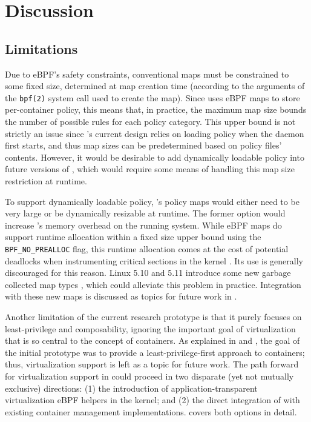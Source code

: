 \section{Discussion}
\label{sec:discussion}

\subsection{Limitations}

Due to eBPF's safety constraints, conventional maps must be constrained to some fixed size, determined at map creation time (according to the arguments of the \texttt{bpf(2)} system call used to create the map). Since \bpfcontain{} uses eBPF maps to store per-container policy, this means that, in practice, the maximum map size bounds the number of possible rules for each policy category. This upper bound is not strictly an issue since \bpfcontain{}'s current design relies on loading policy when the daemon first starts, and thus map sizes can be predetermined based on policy files' contents. However, it would be desirable to add dynamically loadable policy into future versions of \bpfcontain{}, which would require some means of handling this map size restriction at runtime.

To support dynamically loadable policy, \bpfcontain{}'s policy maps would either need to be very large or be dynamically resizable at runtime. The former option would increase \bpfcontain{}'s memory overhead on the running system. While eBPF maps do support runtime allocation within a fixed size upper bound using the \texttt{BPF\_NO\_PREALLOC} flag, this runtime allocation comes at the cost of potential deadlocks when instrumenting critical sections in the kernel \cite{starovoitov2016_prealloc}. Its use is generally discouraged for this reason. Linux 5.10 and 5.11 introduce some new garbage collected map types \cite{singh2020_task_local_storage, singh2020_inode_local_storage}, which could alleviate this problem in practice. Integration with these new maps is discussed as topics for future work in .

Another limitation of the current research prototype is that it purely focuses on least-privilege and composability, ignoring the important goal of virtualization that is so central to the concept of containers. As explained in  and , the goal of the initial \bpfcontain{} prototype was to provide a least-privilege-first approach to containers; thus, virtualization support is left as a topic for future work. The path forward for virtualization support in \bpfcontain{} could proceed in two disparate (yet not mutually exclusive) directions: (1) the introduction of application-transparent virtualization eBPF helpers in the kernel; and (2) the direct integration of \bpfcontain{} with existing container management implementations.  covers both options in detail.

